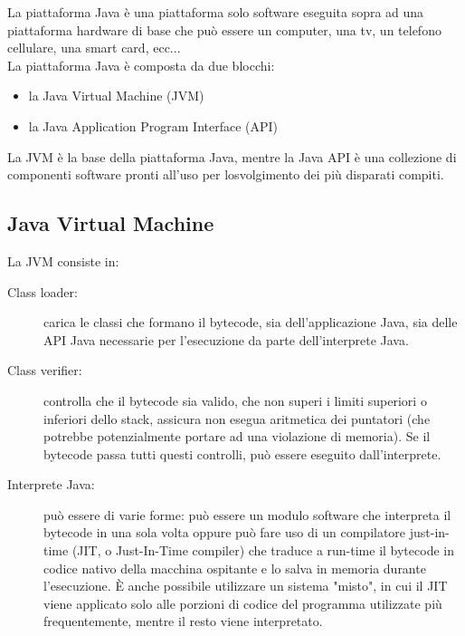 La  piattaforma  Java  \`e  una  piattaforma  solo software eseguita sopra ad  una  piattaforma hardware di base che pu\`o essere un computer, una tv, un telefono cellulare, una smart card, ecc...
\\ La piattaforma Java \`e composta da due blocchi: 
\begin{itemize}
\item la Java Virtual Machine (JVM)
\item la Java Application Program Interface (API)
\end{itemize} 
La JVM \`e  la  base  della  piattaforma  Java, mentre la Java API \`e  una  collezione  di componenti software pronti all’uso per losvolgimento dei pi\`u disparati compiti.
\subsection*{Java Virtual Machine} 
La JVM consiste in:
\begin{description}
\item [Class loader:]
carica le classi che formano il bytecode, sia dell'applicazione Java, sia delle API Java necessarie per l'esecuzione da parte dell'interprete Java.

\item [Class verifier:]
controlla che il bytecode sia valido, che non superi i limiti superiori o inferiori dello stack, assicura non esegua aritmetica dei puntatori (che potrebbe potenzialmente portare ad una violazione di memoria). Se il bytecode passa tutti questi controlli, pu\`o essere eseguito dall'interprete.

\item [Interprete Java:] 
pu\`o essere di varie forme: pu\`o essere un modulo software che interpreta il bytecode in una sola volta oppure pu\`o fare uso di un compilatore just-in-time (JIT, o Just-In-Time compiler) che traduce a run-time il bytecode in codice nativo della macchina ospitante e lo salva in memoria durante l'esecuzione. \`E anche possibile utilizzare un sistema "misto", in cui il JIT viene applicato solo alle porzioni di codice del programma utilizzate pi\`u frequentemente, mentre il resto viene interpretato.
\end{description}


